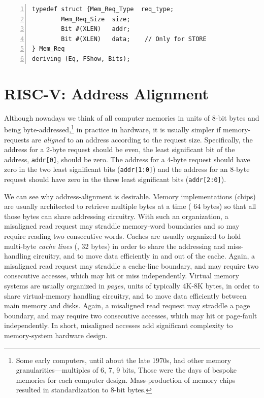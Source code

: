 \begin{Verbatim}[frame=single, numbers=left]
typedef struct {Mem_Req_Type  req_type;
		Mem_Req_Size  size;
		Bit #(XLEN)   addr;
		Bit #(XLEN)   data;    // Only for STORE
} Mem_Req
deriving (Eq, FShow, Bits);
\end{Verbatim}


\section{RISC-V: Address Alignment}


Although nowadays we think of all computer memories in units of 8-bit
bytes and being byte-addressed,\footnote{Some early computers, until
about the late 1970s, had other memory granularities---multiples of 6,
7, 9 bits, {\etc} Those were the days of bespoke memories for each
computer design.  Mass-production of memory chips resulted in
standardization to 8-bit bytes.} in practice in hardware, it is
usually simpler if memory-requests are \emph{aligned} to an address
according to the request size.  Specifically, the address for a 2-byte
request should be even, {\ie} the least significant bit of the
address, \verb|addr[0]|, should be zero.  The address for a 4-byte
request should have zero in the two least significant bits
(\verb|addr[1:0]|) and the address for an 8-byte request should have
zero in the three least significant bits (\verb|addr[2:0]|).

We can see why address-alignment is desirable.  Memory implementations
(chips) are usually architected to retrieve multiple bytes at a time
({\eg} 64 bytes) so that all those bytes can share addressing
circuitry.  With such an organization, a misaligned read request may
straddle memory-word boundaries and so may require reading two
consecutive words.  Caches are usually organized to hold multi-byte
\emph{cache lines} ({\eg}, 32 bytes) in order to share the addressing
and miss-handling circuitry, and to move data efficiently in and out
of the cache.  Again, a misaligned read request may straddle a
cache-line boundary, and may require two consecutive accesses, which
may hit or miss independently.  Virtual memory systems are usually
organized in \emph{pages}, units of typically 4K-8K bytes, in order to
share virtual-memory handling circuitry, and to move data efficiently
between main memory and disks.  Again, a misaligned read request may
straddle a page boundary, and may require two consecutive accesses,
which may hit or page-fault independently.  In short, misaligned
accesses add significant complexity to memory-system hardware design.


